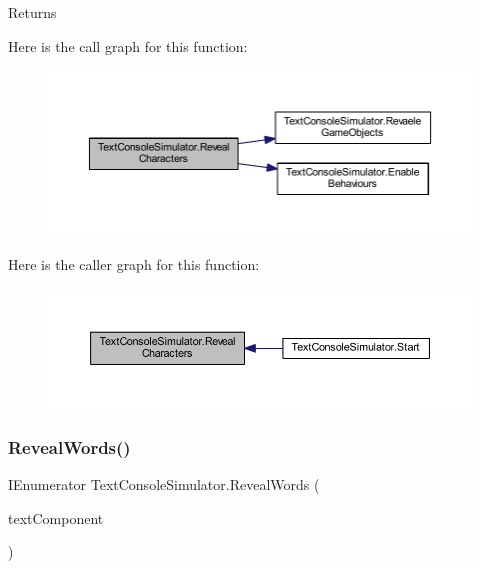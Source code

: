 \begin{DoxyReturn}{Returns}

\end{DoxyReturn}
Here is the call graph for this function\+:
\nopagebreak
\begin{figure}[H]
\begin{center}
\leavevmode
\includegraphics[width=350pt]{class_text_console_simulator_a6740593a0a66d052b4bc2076b0032d96_cgraph}
\end{center}
\end{figure}
Here is the caller graph for this function\+:
\nopagebreak
\begin{figure}[H]
\begin{center}
\leavevmode
\includegraphics[width=350pt]{class_text_console_simulator_a6740593a0a66d052b4bc2076b0032d96_icgraph}
\end{center}
\end{figure}
\mbox{\label{class_text_console_simulator_a02b5d223477f40d452dc46d86f55376f}} 
\subsubsection{\texorpdfstring{Reveal\+Words()}{RevealWords()}}
{\footnotesize\ttfamily I\+Enumerator Text\+Console\+Simulator.\+Reveal\+Words (\begin{DoxyParamCaption}\item[{T\+M\+P\+\_\+\+Text}]{text\+Component }\end{DoxyParamCaption})\hspace{0.3cm}{\ttfamily [private]}}



